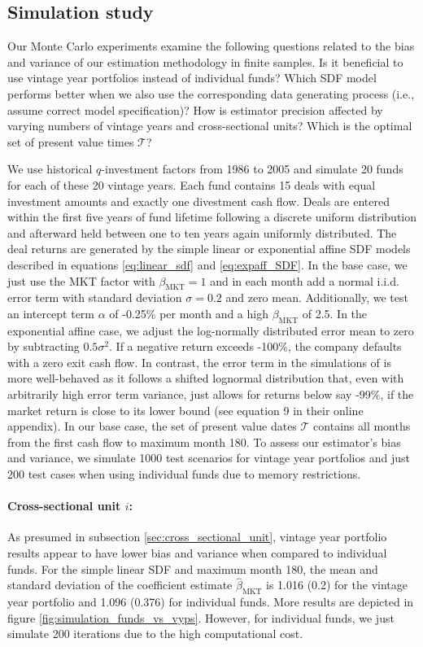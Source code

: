 \documentclass[12pt]{article}
\begin{document}
\subsection{Simulation study}
\label{sec:simulation_study}

Our Monte Carlo experiments examine the following questions related to the bias and variance of our estimation methodology in finite samples.
Is it beneficial to use vintage year portfolios instead of individual funds?
Which SDF model performs better when we also use the corresponding data generating process (i.e., assume correct model specification)?
How is estimator precision affected by varying numbers of vintage years and cross-sectional units?
Which is the optimal set of present value times $\mathcal{T}$?


We use historical $q$-investment factors from 1986 to 2005 and simulate 20 funds for each of these 20 vintage years.
Each fund contains 15 deals with equal investment amounts and exactly one divestment cash flow.
Deals are entered within the first five years of fund lifetime following a discrete uniform distribution and afterward held between one to ten years again uniformly distributed.
The deal returns are generated by the simple linear or exponential affine SDF models described in equations \ref{eq:linear_sdf} and \ref{eq:expaff_SDF}.
In the base case, we just use the MKT factor with $\beta_{\mathrm{MKT}}=1$ and in each month add a normal i.i.d. error term with standard deviation $\sigma=0.2$ and zero mean.
Additionally, we test an intercept term $\alpha$ of -0.25\% per month and a high $\beta_{\mathrm{MKT}}$ of 2.5.
In the exponential affine case, we adjust the log-normally distributed error mean to zero by subtracting $0.5 \sigma^2$.
If a negative return exceeds -100\%, the company defaults with a zero exit cash flow.
In contrast, the error term in the simulations of \cite{DLP12} is more well-behaved as it follows a shifted lognormal distribution that, even with arbitrarily high error term variance, just allows for returns below say -99\%, if the market return is close to its lower bound (see equation 9 in their online appendix).
In our base case, the set of present value dates $\mathcal{T}$ contains all months from the first cash flow to maximum month 180.
To assess our estimator's bias and variance, we simulate 1000 test scenarios for vintage year portfolios and just 200 test cases when using individual funds due to memory restrictions.


\paragraph{Cross-sectional unit $i$:}
As presumed in subsection \ref{sec:cross_sectional_unit}, vintage year portfolio results appear to have lower bias and variance when compared to individual funds.
For the simple linear SDF and maximum month 180, the mean and standard deviation of the coefficient estimate $\hat{\beta}_{\mathrm{MKT}}$ is 1.016 (0.2) for the vintage year portfolio and 1.096 (0.376) for individual funds. 
More results are depicted in figure \ref{fig:simulation_funds_vs_vyps}.
However, for individual funds, we just simulate 200 iterations due to the high computational cost.
\end{document}
